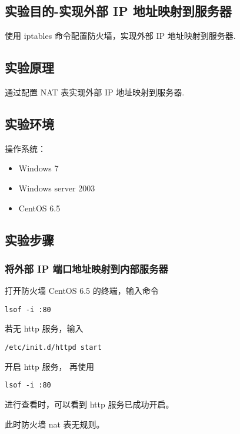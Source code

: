 \subsection{实验目的-实现外部 IP 地址映射到服务器}
使用 iptables 命令配置防火墙，实现外部 IP 地址映射到服务器.
%
\subsection{实验原理}
通过配置 NAT 表实现外部 IP 地址映射到服务器.
%
\subsection{实验环境}
操作系统：
\begin{itemize}
  \item Windows 7
  \item Windows server 2003
  \item CentOS 6.5
\end{itemize}
%
\subsection{实验步骤}
\subsubsection{将外部 IP 端口地址映射到内部服务器}
打开防火墙 CentOS 6.5 的终端，输入命令
\begin{verbatim}
lsof -i :80
\end{verbatim}
若无 http 服务，输入
\begin{verbatim}
/etc/init.d/httpd start
\end{verbatim}
开启 http 服务，
再使用
\begin{verbatim}
lsof -i :80
\end{verbatim}
进行查看时，可以看到 http 服务已成功开启。

此时防火墙 nat 表无规则。

